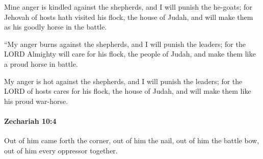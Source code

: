 			\begin{versebox}
					\item[BHS] 
					\item[LXX] 
					\item[ASV] Mine anger is kindled against the shepherds, and I will punish the he-goats; for Jehovah of hosts hath visited his flock, the house of Judah, and will make them as his goodly horse in the battle.
					\item[NIV] “My anger burns against the shepherds, and I will punish the leaders; for the LORD Almighty will care for his flock, the people of Judah, and make them like a proud horse in battle.
					\item[NRSV] My anger is hot against the shepherds, and I will punish the leaders; for the LORD of hosts cares for his flock, the house of Judah, and will make them like his proud war-horse.
			\end{versebox}

		\paragraph{Zechariah 10:4} %
			\label{ZECHARIAH-10-4}

			Out of him came forth the corner, out of him the nail, out of him the battle bow, out of him every oppressor together.

